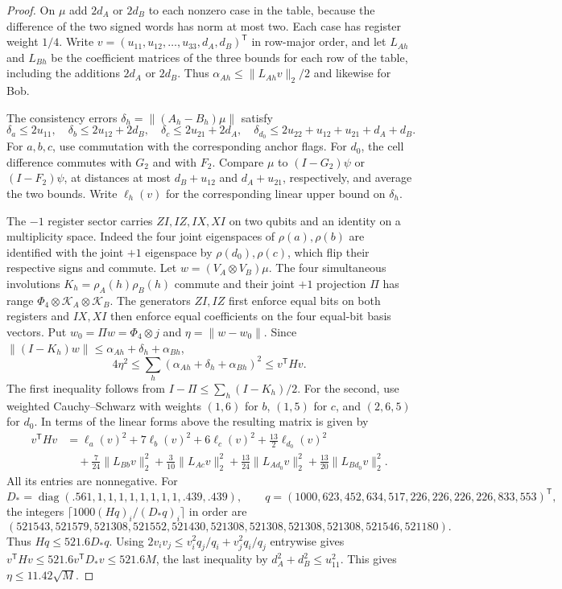 \begin{proof}
On $\mu$ add $2d_A$ or $2d_B$ to each nonzero case in the table, because
the difference of the two signed words has norm at most two. Each case
has register weight $1/4$. Write
$v=(u_{11},u_{12},\ldots,u_{33},d_A,d_B)^{\mathsf T}$ in row-major
order, and let $L_{Ah}$ and $L_{Bh}$ be the coefficient matrices of
the three bounds for each row of the table, including the additions
$2d_A$ or $2d_B$. Thus $\alpha_{Ah}\le\|L_{Ah}v\|_2/2$ and
likewise for Bob.

The consistency errors $\delta_h=\|(A_h-B_h)\mu\|$ satisfy
\[
 \delta_a\le 2u_{11},\quad
 \delta_b\le 2u_{12}+2d_B,\quad
 \delta_c\le 2u_{21}+2d_A,\quad
 \delta_{d_0}\le 2u_{22}+u_{12}+u_{21}+d_A+d_B .
\]
For $a,b,c$, use commutation with the corresponding anchor flags.
For $d_0$, the cell difference commutes with $G_2$ and with $F_2$.
Compare $\mu$ to $(I-G_2)\psi$ or $(I-F_2)\psi$, at distances at most
$d_B+u_{12}$ and $d_A+u_{21}$, respectively, and average the two bounds.
Write $\ell_h(v)$ for the corresponding linear upper bound on $\delta_h$.

The $-1$ register sector carries $ZI,IZ,IX,XI$ on two qubits and an
identity on a multiplicity space. Indeed the four joint eigenspaces of
$\rho(a),\rho(b)$ are identified with the joint $+1$ eigenspace by
$\rho(d_0),\rho(c)$, which flip their respective signs and commute.
Let $w=(V_A\otimes V_B)\mu$. The four simultaneous involutions
$K_h=\rho_A(h)\rho_B(h)$ commute and their joint $+1$ projection
$\Pi$ has range $\Phi_4\otimes\mathcal K_A\otimes\mathcal K_B$.
The generators $ZI,IZ$ first enforce equal bits on both registers and
$IX,XI$ then enforce equal coefficients on the four equal-bit basis
vectors. Put $w_0=\Pi w=\Phi_4\otimes j$ and $\eta=\|w-w_0\|$. Since
$\|(I-K_h)w\|\le\alpha_{Ah}+\delta_h+\alpha_{Bh}$,
\[
 4\eta^2\le\sum_h(\alpha_{Ah}+\delta_h+\alpha_{Bh})^2\le v^{\mathsf T}Hv .
\]
The first inequality follows from $I-\Pi\le\sum_h(I-K_h)/2$.
For the second, use weighted Cauchy--Schwarz with weights $(1,6)$
for $b$, $(1,5)$ for $c$, and $(2,6,5)$ for $d_0$. In terms of the
linear forms above the resulting matrix is given by
\begin{align*}
 v^{\mathsf T}Hv
 &=\ell_a(v)^2+7\ell_b(v)^2+6\ell_c(v)^2+\tfrac{13}{2}\ell_{d_0}(v)^2\\
 &\quad+\tfrac7{24}\|L_{Bb}v\|_2^2+\tfrac3{10}\|L_{Ac}v\|_2^2
   +\tfrac{13}{24}\|L_{Ad_0}v\|_2^2+\tfrac{13}{20}\|L_{Bd_0}v\|_2^2.
\end{align*}
All its entries are nonnegative. For
\[
 D_*=\operatorname{diag}(.561,1,1,1,1,1,1,1,1,.439,.439),\qquad
 q=(1000,623,452,634,517,226,226,226,226,833,553)^{\mathsf T},
\]
the integers $\lceil1000(Hq)_i/(D_*q)_i\rceil$ in order are
\[
 (521543,521579,521308,521552,521430,521308,521308,521308,521308,521546,521180).
\]
Thus $Hq\le521.6D_*q$. Using
$2v_iv_j\le v_i^2q_j/q_i+v_j^2q_i/q_j$ entrywise gives
$v^{\mathsf T}Hv\le521.6v^{\mathsf T}D_*v\le521.6M$, the last
inequality by $d_A^2+d_B^2\le u_{11}^2$. This gives
$\eta\le11.42\sqrt M$.


\end{proof}
